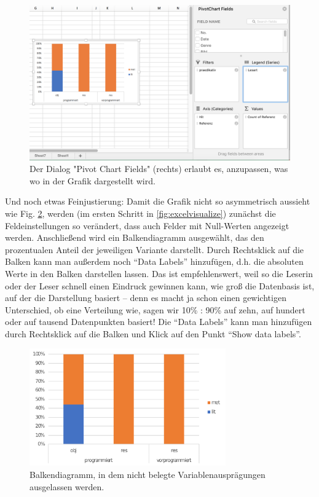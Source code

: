 \documentclass[]{article}
\begin{document}
\begin{figure}
\includegraphics[width=4.49in]{docs/fig/excel_pivotchartfields} \caption{Der Dialog "Pivot Chart Fields" (rechts) erlaubt es, anzupassen, was wo in der Grafik dargestellt wird.}\label{fig:pivotchartfields}
\end{figure}

Und noch etwas Feinjustierung: Damit die Grafik nicht so asymmetrisch
aussieht wie Fig. \ref{fig:asymmetric}, werden (im ersten Schritt in
\ref{fig:excelvisualize}) zunächst die Feldeinstellungen so verändert,
dass auch Felder mit Null-Werten angezeigt werden. Anschließend wird ein
Balkendiagramm ausgewählt, das den prozentualen Anteil der jeweiligen
Variante darstellt. Durch Rechtsklick auf die Balken kann man außerdem
noch \enquote{Data Labels} hinzufügen, d.h. die absoluten Werte in den
Balken darstellen lassen. Das ist empfehlenswert, weil so die Leserin
oder der Leser schnell einen Eindruck gewinnen kann, wie groß die
Datenbasis ist, auf der die Darstellung basiert -- denn es macht ja
schon einen gewichtigen Unterschied, ob eine Verteilung wie, sagen wir
10\% : 90\% auf zehn, auf hundert oder auf tausend Datenpunkten basiert!
Die \enquote{Data Labels} kann man hinzufügen durch Rechtsklick auf die
Balken und Klick auf den Punkt \enquote{Show data labels}.

\begin{figure}
\includegraphics[width=3.32in]{docs/fig/excel_asymmetric} \caption{Balkendiagramm, in dem nicht belegte Variablenausprägungen ausgelassen werden.}\label{fig:asymmetric}
\end{figure}
\end{document}
